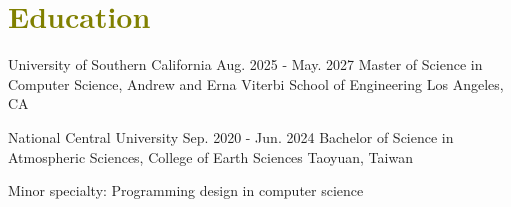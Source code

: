 

\section{\textcolor{olive}{\textbf{Education}}}
	\resumeSubHeadingListStart
		
    \resumeSubheading
        {University of Southern California}
        {Aug. 2025 - May. 2027}
        {Master of Science in Computer Science, Andrew and Erna Viterbi School of Engineering}
        {\textcolor{gray}{\footnotesize{\faMapMarker}} Los Angeles, CA}

        \resumeItemListStart

        \resumeItemListEnd
		
    \resumeSubheading
        {National Central University}
        {Sep. 2020 - Jun. 2024}
        {Bachelor of Science in Atmospheric Sciences, College of Earth Sciences \myScore}
        {\textcolor{gray}{\footnotesize{\faMapMarker}} Taoyuan, Taiwan}
		
    \resumeItemListStart
        \item {
            Minor specialty: Programming design in computer science
        }
    \resumeItemListEnd
		  
	\resumeSubHeadingListEnd
